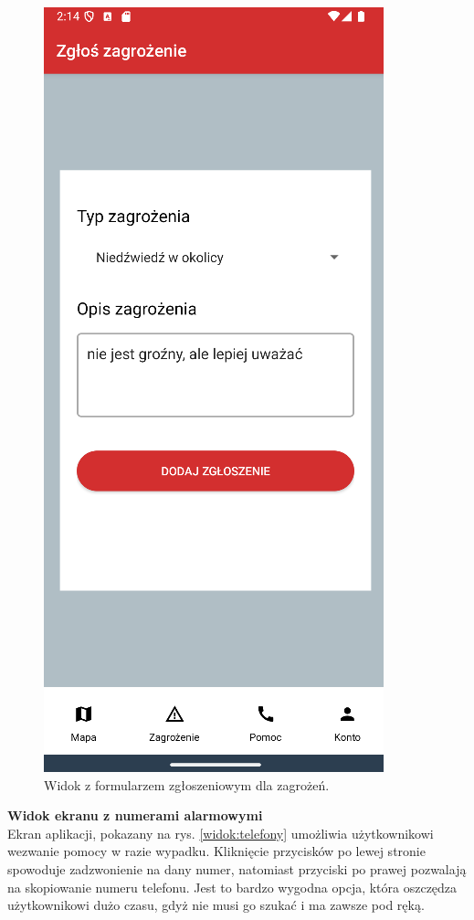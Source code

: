 \begin{figure}[H]
    \centering
    \includegraphics[scale=0.70]{img/imp/widok-danger.png}
    \caption{Widok z formularzem zgłoszeniowym dla zagrożeń.}
    \label{widok:zgłoszenie}
\end{figure}

\noindent
\textbf{Widok ekranu z numerami alarmowymi} \\
\indent Ekran aplikacji, pokazany na rys. \ref{widok:telefony} umożliwia użytkownikowi wezwanie pomocy w razie wypadku. Kliknięcie przycisków po lewej stronie spowoduje zadzwonienie na dany numer, natomiast przyciski po prawej pozwalają na skopiowanie numeru telefonu. Jest to bardzo wygodna opcja, która oszczędza użytkownikowi dużo czasu, gdyż nie musi go szukać i ma zawsze pod ręką.

